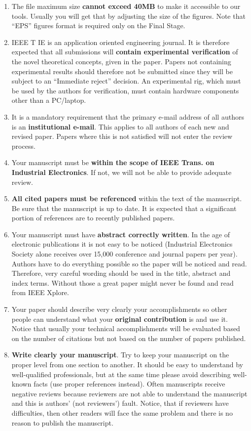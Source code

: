 \documentclass[journal]{IEEEtranTICPS}
\begin{document}
\begin{enumerate}[1)]
	\item The file maximum size \textbf{cannot exceed 40MB} to make it accessible to our tools. Usually you will get that by adjusting the size of the figures. Note that ``EPS'' figures format is required only on the Final Stage.
	\item IEEE T IE is an application oriented engineering journal. It is therefore expected that all submissions will \textbf{contain experimental verification} of the novel theoretical concepts, given in the paper. Papers not containing experimental results should therefore not be submitted since they will be subject to an ``Immediate reject'' decision. An experimental rig, which must be used by the authors for verification, must contain hardware components other than a PC/laptop.	
	\item It is a mandatory requirement that the primary e-mail address of all authors is an \textbf{institutional e-mail}. This applies to all authors of each new and revised paper. Papers where this is not satisfied will not enter the review process.
	\item Your manuscript must be \textbf{within the scope of IEEE Trans. on Industrial Electronics}. If not, we will not be able to provide adequate review.
	\item \textbf{All cited papers must be referenced} within the text of the manuscript. Be sure that the manuscript is up to date. It is expected that a significant portion of references are to recently published papers.
	\item Your manuscript must have \textbf{abstract correctly written}. In the age of electronic publications it is not easy to be noticed (Industrial Electronics Society alone receives over 15,000 conference and journal papers per year). Authors have to do everything possible so the paper will be noticed and read. Therefore, very careful wording should be used in the title, abstract and index terms. Without those a great paper might never be found and read from IEEE Xplore.
	\item Your paper should describe very clearly your accomplishments so other people can understand what your \textbf{original contribution } is and use it. Notice that usually your technical accomplishments will be evaluated based on the number of citations but not based on the number of papers published.
	\item \textbf{Write clearly your manuscript}. Try to keep your manuscript on the proper level from one section to another. It should be easy to understand by well-qualified professionals, but at the same time please avoid describing well-known facts (use proper references instead). Often manuscripts receive negative reviews because reviewers are not able to understand the manuscript and this is authors' (not reviewers') fault. Notice, that if reviewers have difficulties, then other readers will face the same problem and there is no reason to publish the manuscript.
\end{enumerate}
\end{document}
